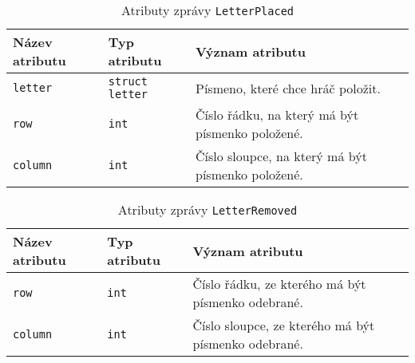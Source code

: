 \documentclass[12pt, a4paper]{article}
\begin{document}
		
\begin{center}
		\begin{table}[!ht]
		     \caption{Atributy zprávy \texttt{LetterPlaced}}
		\begin{tabularx}{\textwidth}{|l|l|X|}
			\hline
			\textbf{Název atributu} & \textbf{Typ atributu} & \textbf{Význam atributu} \\ 
			\hline
			\texttt{letter}          &\texttt{struct letter}&Písmeno, které chce hráč položit.\\
			\hline
			\texttt{row}          &\texttt{int}&Číslo řádku, na který má být písmenko položené.\\
			\texttt{column}          &\texttt{int}&Číslo sloupce, na který má být písmenko položené.\\
			\hline
		\end{tabularx}
		\end{table}
\end{center}


		
\begin{center}
		\begin{table}[!ht]
		     \caption{Atributy zprávy \texttt{LetterRemoved}}
		\begin{tabularx}{\textwidth}{|l|l|X|}
			\hline
			\textbf{Název atributu} & \textbf{Typ atributu} & \textbf{Význam atributu} \\ 
			\hline
			\texttt{row}          &\texttt{int}&Číslo řádku, ze kterého má být písmenko odebrané.\\
			\texttt{column}          &\texttt{int}&Číslo sloupce, ze kterého má být písmenko odebrané.\\
			\hline
		\end{tabularx}
		\end{table}
\end{center}  		
\end{document}
